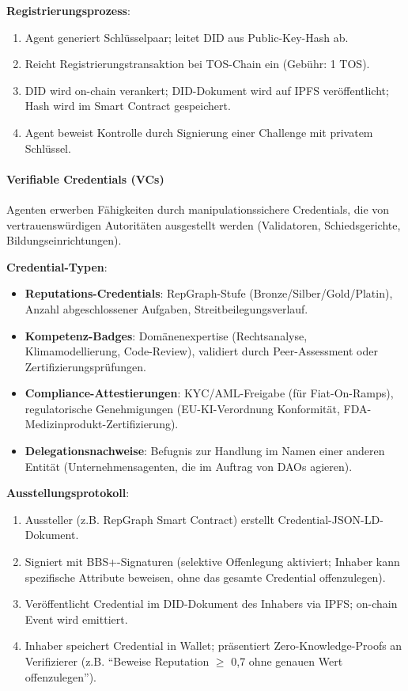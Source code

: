 \documentclass[11pt]{article}
\begin{document}
\textbf{Registrierungsprozess}:
\begin{enumerate}[noitemsep]
  \item Agent generiert Schlüsselpaar; leitet DID aus Public-Key-Hash ab.
  \item Reicht Registrierungstransaktion bei TOS-Chain ein (Gebühr: 1 TOS).
  \item DID wird on-chain verankert; DID-Dokument wird auf IPFS veröffentlicht; Hash wird im Smart Contract gespeichert.
  \item Agent beweist Kontrolle durch Signierung einer Challenge mit privatem Schlüssel.
\end{enumerate}

\paragraph{Verifiable Credentials (VCs)}
Agenten erwerben Fähigkeiten durch manipulationssichere Credentials, die von vertrauenswürdigen Autoritäten ausgestellt werden (Validatoren, Schiedsgerichte, Bildungseinrichtungen).

\textbf{Credential-Typen}:
\begin{itemize}[noitemsep]
  \item \textbf{Reputations-Credentials}: RepGraph-Stufe (Bronze/Silber/Gold/Platin), Anzahl abgeschlossener Aufgaben, Streitbeilegungsverlauf.
  \item \textbf{Kompetenz-Badges}: Domänenexpertise (Rechtsanalyse, Klimamodellierung, Code-Review), validiert durch Peer-Assessment oder Zertifizierungsprüfungen.
  \item \textbf{Compliance-Attestierungen}: KYC/AML-Freigabe (für Fiat-On-Ramps), regulatorische Genehmigungen (EU-KI-Verordnung Konformität, FDA-Medizinprodukt-Zertifizierung).
  \item \textbf{Delegationsnachweise}: Befugnis zur Handlung im Namen einer anderen Entität (Unternehmensagenten, die im Auftrag von DAOs agieren).
\end{itemize}

\textbf{Ausstellungsprotokoll}:
\begin{enumerate}[noitemsep]
  \item Aussteller (z.B. RepGraph Smart Contract) erstellt Credential-JSON-LD-Dokument.
  \item Signiert mit BBS+-Signaturen (selektive Offenlegung aktiviert; Inhaber kann spezifische Attribute beweisen, ohne das gesamte Credential offenzulegen).
  \item Veröffentlicht Credential im DID-Dokument des Inhabers via IPFS; on-chain Event wird emittiert.
  \item Inhaber speichert Credential in Wallet; präsentiert Zero-Knowledge-Proofs an Verifizierer (z.B. ``Beweise Reputation $\geq$ 0,7 ohne genauen Wert offenzulegen'').
\end{enumerate}
\end{document}
